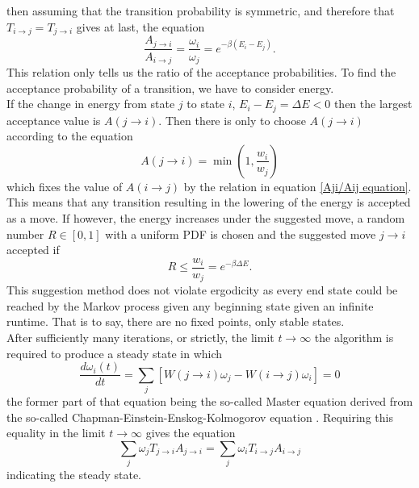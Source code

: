\documentclass[10pt,a4paper]{article}
\begin{document}
then assuming that the transition probability is symmetric, and therefore that $T_{i\rightarrow j} = T_{j\rightarrow i}$ gives at last, the equation
\begin{equation}\label{Aji/Aij equation}
\frac{A_{j\rightarrow i}}{A_{i\rightarrow j}} =\frac{\omega_i }{\omega_j } = e^{-\beta(E_i-E_j)}.
\end{equation}
This relation only tells us the ratio of the acceptance probabilities. To find the acceptance probability of a transition, we have to consider energy.\\ If the change in energy from state $j$ to state $i$, $E_i-E_j=\Delta E<0$ then the largest acceptance value is $A(j\rightarrow i)$. Then there is only to choose $A(j \rightarrow i)$ according to the equation
\begin{equation}
A(j \rightarrow i) = \min \left( 1, \frac{w_i}{w_j} \right)
\end{equation}
which fixes the value of $A(i \rightarrow j)$ by the relation in equation \eqref{Aji/Aij equation}. This means that any transition resulting in the lowering of the energy is accepted as a move. If however, the energy increases under the suggested move, a random number $R \in [0,1]$ with a uniform PDF is chosen and the suggested move $j\rightarrow i$ accepted if
\begin{equation}
R \leq \frac{w_i}{w_j} =e^{-\beta \Delta E}.
\end{equation}
This suggestion method does not violate ergodicity as every end state could be reached by the Markov process given any beginning state given an infinite runtime. That is to say, there are no fixed points, only stable states.\\After sufficiently many iterations, or strictly, the limit $t\rightarrow \infty$ the algorithm is required to produce a steady state in which
\begin{equation}
\dfrac{d\omega_i(t)}{dt} = \sum_j \left[ W(j\rightarrow i)\omega_j - W(i\rightarrow j)\omega_i \right] = 0
\end{equation}
the former part of that equation being the so-called Master equation derived from the so-called Chapman-Einstein-Enskog-Kolmogorov equation \cite{Lecture_Notes_Fall_2015}. Requiring this equality in the limit $t\rightarrow \infty$ gives the equation
\begin{equation}
\sum_j \omega_jT_{j\rightarrow i}A_{j\rightarrow i} = \sum_j \omega_iT_{i\rightarrow j}A_{i\rightarrow j}
\end{equation}
indicating the steady state.
\end{document}
